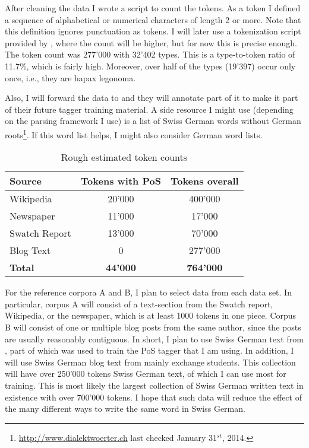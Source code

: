 \documentclass[11pt,letterpaper, covington]{article}
\begin{document}
After cleaning the data I wrote a script to count the tokens. As a token I defined a sequence of alphabetical or numerical characters of length 2 or more. Note that this definition ignores punctuation as tokens. I will later use a tokenization script provided by \citet{AH14}, where the count will be higher, but for now this is precise enough. The token count was 277'000 with 32'402 types. This is a type-to-token ratio of 11.7\%, which is fairly high. Moreover, over half of the types (19'397) occur only once, i.e., they are hapax legonoma.

Also, I will forward the data to \citet{AH14} and they will annotate part of it to make it part of their future tagger training material. A side resource I might use (depending on the parsing framework I use) is a list of Swiss German words without German roots\footnote{\url{http://www.dialektwoerter.ch} last checked January 31$^{st}$, 2014.}. If this word list helps, I might also consider German word lists.

\begin{table}
\center
\begin{tabular}{ | l | c | c | }
   \hline
   \textbf{Source} & \textbf{Tokens with PoS} & \textbf{Tokens overall} \\ \hline
   Wikipedia & 20'000 & 400'000 \\
   Newspaper & 11'000 & 17'000 \\ 
   Swatch Report & 13'000 & 70'000 \\
   Blog Text & 0 & 277'000 \\ \hline
   \textbf{Total} & \textbf{44'000} & \textbf{764'000} \\ \hline
\end{tabular}
\caption{Rough estimated token counts}
\end{table}

For the reference corpora A and B, I plan to select data from each data set. In particular, corpus A will consist of a text-section from the Swatch report, Wikipedia, or the newspaper, which is at least 1000 tokens in one piece. Corpus B will consist of one or multiple blog posts from the same author, since the posts are usually reasonably contiguous. In short, I plan to use Swiss German text from \cite{AH14}, part of which was used to train the PoS tagger that I am using. In addition, I will use Swiss German blog text from mainly exchange students. This collection will have over 250'000 tokens Swiss German text, of which I can use most for training. This is most likely the largest collection of Swiss German written text in existence with over 700'000 tokens. I hope that such data will reduce the effect of the many different ways to write the same word in Swiss German.
\end{document}
